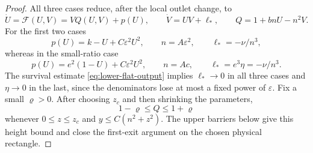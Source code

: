 \begin{proof}
All three cases reduce, after the local outlet change, to
\begin{equation}\label{eq:lower-positive-reference-system}
 \dot U=\mathcal F(U,V)=VQ(U,V)+p(U),\qquad
 \dot V=UV+\ell_*,\qquad Q=1+bnU-n^2V.
\end{equation}
For the first two cases
\[
 p(U)=k-U+C\varepsilon^2U^2,\qquad
 n=A\varepsilon^2,\qquad \ell_*=-\nu/n^3,
\]
whereas in the small-ratio case
\[
 p(U)=e^2(1-U)+C\varepsilon^2U^2,\qquad
 n=Ac,\qquad \ell_*=e^3\eta=-\nu/n^3.
\]
The survival estimate \eqref{eq:lower-flat-output} implies
$\ell_*\to0$ in all three cases and $\eta\to0$ in the last, since the
denominators lose at most a fixed power of $\varepsilon$.  Fix a small
$\varrho>0$.  After choosing $z_c$ and then shrinking the parameters,
\begin{equation}\label{eq:lower-positive-reference-Q}
 1-\varrho\le Q\le1+\varrho
\end{equation}
whenever $0\le z\le z_c$ and $y\le C(n^2+z^2)$.
The upper barriers below give this height bound and close the first-exit
argument on the chosen physical rectangle.


\end{proof}
